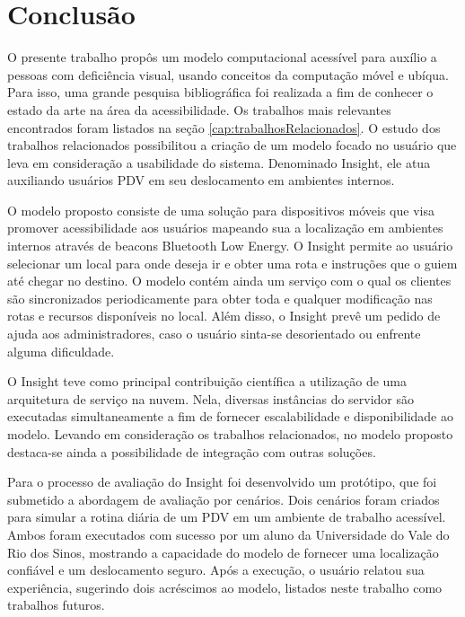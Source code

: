 \documentclass[twoside,english,brazilian]{UNISINOSartigo}
\begin{document}
\section{Conclusão}
O presente trabalho propôs um modelo computacional acessível para auxílio a pessoas com deficiência visual, usando conceitos da computação móvel e ubíqua. Para isso, uma grande pesquisa bibliográfica foi realizada a fim de conhecer o estado da arte na área da acessibilidade. Os trabalhos mais relevantes encontrados foram listados na seção \ref{cap:trabalhosRelacionados}. O estudo dos trabalhos relacionados possibilitou a criação de um modelo focado no usuário que leva em consideração a usabilidade do sistema. Denominado Insight, ele atua auxiliando usuários PDV em seu deslocamento em ambientes internos. 

O modelo proposto consiste de uma solução para dispositivos móveis que visa promover acessibilidade aos usuários mapeando sua a localização em ambientes internos através de beacons Bluetooth Low Energy. O Insight permite ao usuário selecionar um local para onde deseja ir e obter uma rota e instruções que o guiem até chegar no destino. O modelo contém ainda um serviço com o qual os clientes são sincronizados periodicamente para obter toda e qualquer modificação nas rotas e recursos disponíveis no local. Além disso, o Insight prevê um pedido de ajuda aos administradores, caso o usuário sinta-se desorientado ou enfrente alguma dificuldade.

O Insight teve como principal contribuição científica a utilização de uma arquitetura de serviço na nuvem. Nela, diversas instâncias do servidor são executadas simultaneamente a fim de fornecer escalabilidade e disponibilidade ao modelo. Levando em consideração os trabalhos relacionados, no modelo proposto destaca-se ainda a possibilidade de integração com outras soluções.

Para o processo de avaliação do Insight foi desenvolvido um protótipo, que foi submetido a abordagem de avaliação por cenários. Dois cenários foram criados para simular a rotina diária de um PDV em um ambiente de trabalho acessível. Ambos foram executados com sucesso por um aluno da Universidade do Vale do Rio dos Sinos, mostrando a capacidade do modelo de fornecer uma localização confiável e um deslocamento seguro. Após a execução, o usuário relatou sua experiência, sugerindo dois acréscimos ao modelo, listados neste trabalho como trabalhos futuros.
\end{document}
